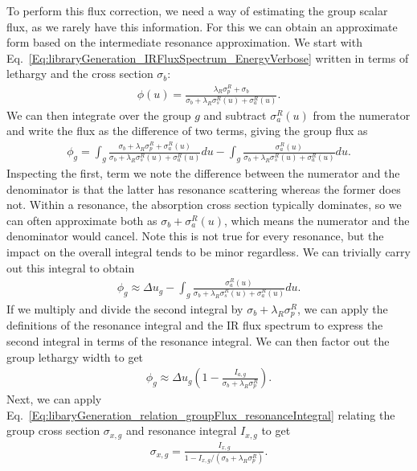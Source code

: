 To perform this flux correction, we need a way of estimating the group scalar flux, as we rarely have this information. For this we can obtain an approximate form based on the intermediate resonance approximation. We start with Eq.~\eqref{Eq:libraryGeneration_IRFluxSpectrum_EnergyVerbose} written in terms of lethargy and the cross section $\sigma_b$:
\begin{align}
  \phi(u) = \frac{ \lambda_R \sigma_p^R + \sigma_b }{ \sigma_b + \lambda_R \sigma_s^R(u) + \sigma_a^R(u) } .
\end{align}
We can then integrate over the group $g$ and subtract $\sigma_a^R(u)$ from the numerator and write the flux as the difference of two terms, giving the group flux as
\begin{align}
  \phi_g = \int_g \frac{ \sigma_b  + \lambda_R \sigma_p^R + \sigma_a^R(u) }{ \sigma_b + \lambda_R \sigma_s^R(u) + \sigma_a^R(u) } du - \int_g \frac{ \sigma_a^R(u) }{ \sigma_b + \lambda_R \sigma_s^R(u) + \sigma_a^R(u) } du .
\end{align}
Inspecting the first, term we note the difference between the numerator and the denominator is that the latter has resonance scattering whereas the former does not. Within a resonance, the absorption cross section typically dominates, so we can often approximate both as $\sigma_b + \sigma_a^R(u)$, which means the numerator and the denominator would cancel. Note this is not true for every resonance, but the impact on the overall integral tends to be minor regardless. We can trivially carry out this integral to obtain
\begin{align}
  \phi_g \approx \Delta u_g - \int_g \frac{ \sigma_a^R(u) }{ \sigma_b + \lambda_R \sigma_s^R(u) + \sigma_a^R(u) } du .
\end{align}
If we multiply and divide the second integral by $\sigma_b + \lambda_R \sigma_p^R$, we can apply the definitions of the resonance integral and the IR flux spectrum to express the second integral in terms of the resonance integral. We can then factor out the group lethargy width to get
\begin{align}
  \phi_g \approx \Delta u_g \left( 1 - \frac{ I_{a,g} }{ \sigma_b + \lambda_R \sigma_p^R } \right) . \label{Eq:libraryGeneration_approximateGroupFlux_step1} 
\end{align}
Next, we can apply Eq.~\eqref{Eq:libaryGeneration_relation_groupFlux_resonanceIntegral} relating the group cross section $\sigma_{x,g}$ and resonance integral $I_{x,g}$ to get
\begin{align}
  \sigma_{x,g} = \frac{ I_{x,g} }{ 1 - I_{x,g} /( \sigma_b + \lambda_R \sigma_p^R ) } .
\end{align}
